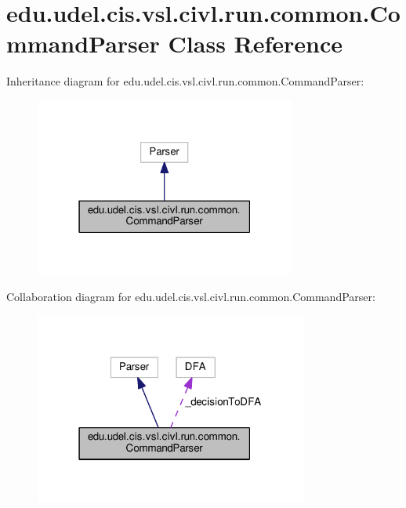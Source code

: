 \hypertarget{classedu_1_1udel_1_1cis_1_1vsl_1_1civl_1_1run_1_1common_1_1CommandParser}{}\section{edu.\+udel.\+cis.\+vsl.\+civl.\+run.\+common.\+Command\+Parser Class Reference}
\label{classedu_1_1udel_1_1cis_1_1vsl_1_1civl_1_1run_1_1common_1_1CommandParser}


Inheritance diagram for edu.\+udel.\+cis.\+vsl.\+civl.\+run.\+common.\+Command\+Parser\+:
\nopagebreak
\begin{figure}[H]
\begin{center}
\leavevmode
\includegraphics[width=243pt]{classedu_1_1udel_1_1cis_1_1vsl_1_1civl_1_1run_1_1common_1_1CommandParser__inherit__graph}
\end{center}
\end{figure}


Collaboration diagram for edu.\+udel.\+cis.\+vsl.\+civl.\+run.\+common.\+Command\+Parser\+:
\nopagebreak
\begin{figure}[H]
\begin{center}
\leavevmode
\includegraphics[width=255pt]{classedu_1_1udel_1_1cis_1_1vsl_1_1civl_1_1run_1_1common_1_1CommandParser__coll__graph}
\end{center}
\end{figure}
